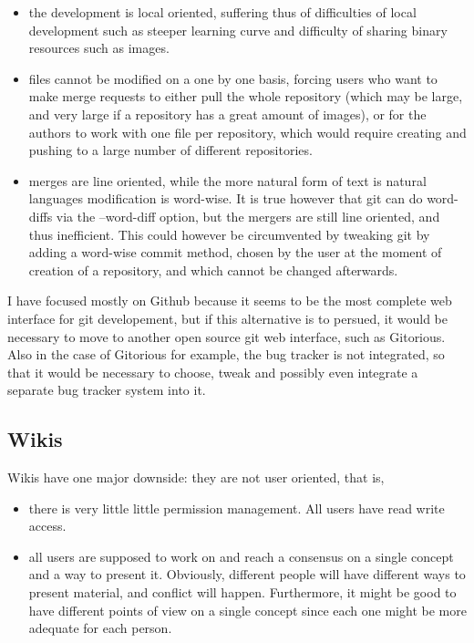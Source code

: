 \documentclass[12pt]{article}
\begin{document}
\begin{itemize}
  \item the development is local oriented, suffering thus of difficulties of local development such as steeper learning curve and difficulty of sharing binary resources such as images.
  \item files cannot be modified on a one by one basis, forcing users who want to make merge requests to either pull the whole repository (which may be large, and very large if a repository has a great amount of images), or for the authors to work with one file per repository, which would require creating and pushing to a large number of different repositories.
  \item merges are line oriented, while the more natural form of text is natural languages modification is word-wise. It is true however that git can do word-diffs via the --word-diff option, but the mergers are still line oriented, and thus inefficient. This could however be circumvented by tweaking git by adding a word-wise commit method, chosen by the user at the moment of creation of a repository, and which cannot be changed afterwards.
\end{itemize}

I have focused mostly on Github because it seems to be the most complete web interface for git developement, but if this alternative is to persued, it would be necessary to move to another open source git web interface, such as Gitorious. Also in the case of Gitorious for example, the bug tracker is not integrated, so that it would be necessary to choose, tweak and possibly even integrate a separate bug tracker system into it.

\subsection{Wikis}

Wikis have one major downside: they are not user oriented, that is, 

\begin{itemize}
  \item there is very little little permission management. All users have read write access.
  \item all users are supposed to work on and reach a consensus on a single concept and a way to present it. Obviously, different people will have different ways to present material, and conflict will happen. Furthermore, it might be good to have different points of view on a single concept since each one might be more adequate for each person.
\end{itemize}
\end{document}
